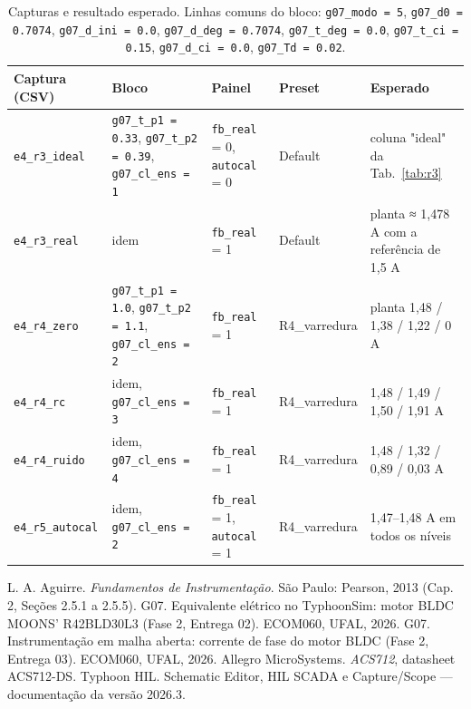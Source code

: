 \documentclass[10pt,a4paper]{article}
\begin{document}
\begin{table}[!htbp]\centering\footnotesize
\caption{Capturas e resultado esperado. Linhas comuns do bloco: \texttt{g07\_modo = 5}, \texttt{g07\_d0 = 0.7074}, \texttt{g07\_d\_ini = 0.0}, \texttt{g07\_d\_deg = 0.7074}, \texttt{g07\_t\_deg = 0.0}, \texttt{g07\_t\_ci = 0.15}, \texttt{g07\_d\_ci = 0.0}, \texttt{g07\_Td = 0.02}.}\label{tab:rot}
\begin{tabularx}{\textwidth}{p{2.6cm}p{3.6cm}p{2.3cm}p{2.0cm}Y}\toprule
Captura (CSV) & Bloco & Painel & Preset & Esperado\\\midrule
\texttt{e4\_r3\_ideal} & \texttt{g07\_t\_p1 = 0.33}, \texttt{g07\_t\_p2 = 0.39}, \texttt{g07\_cl\_ens = 1} & \texttt{fb\_real} = 0, \texttt{autocal} = 0 & Default & coluna "ideal" da Tab.~\ref{tab:r3}\\
\texttt{e4\_r3\_real} & idem & \texttt{fb\_real} = 1 & Default & planta ≈ 1,478 A com a referência de 1,5 A\\
\texttt{e4\_r4\_zero} & \texttt{g07\_t\_p1 = 1.0}, \texttt{g07\_t\_p2 = 1.1}, \texttt{g07\_cl\_ens = 2} & \texttt{fb\_real} = 1 & R4\_varredura & planta 1,48 / 1,38 / 1,22 / 0 A\\
\texttt{e4\_r4\_rc} & idem, \texttt{g07\_cl\_ens = 3} & \texttt{fb\_real} = 1 & R4\_varredura & 1,48 / 1,49 / 1,50 / 1,91 A\\
\texttt{e4\_r4\_ruido} & idem, \texttt{g07\_cl\_ens = 4} & \texttt{fb\_real} = 1 & R4\_varredura & 1,48 / 1,32 / 0,89 / 0,03 A\\
\texttt{e4\_r5\_autocal} & idem, \texttt{g07\_cl\_ens = 2} & \texttt{fb\_real} = 1, \texttt{autocal} = 1 & R4\_varredura & 1,47–1,48 A em todos os níveis\\\bottomrule
\end{tabularx}
\end{table}

\begin{thebibliography}{9}\small
{} L. A. Aguirre. \emph{Fundamentos de Instrumentação}. São Paulo: Pearson, 2013 (Cap. 2, Seções 2.5.1 a 2.5.5).
 G07. Equivalente elétrico no TyphoonSim: motor BLDC MOONS' R42BLD30L3 (Fase 2, Entrega 02). ECOM060, UFAL, 2026.
 G07. Instrumentação em malha aberta: corrente de fase do motor BLDC (Fase 2, Entrega 03). ECOM060, UFAL, 2026.
 Allegro MicroSystems. \emph{ACS712}, datasheet ACS712-DS.
 Typhoon HIL. Schematic Editor, HIL SCADA e Capture/Scope — documentação da versão 2026.3.
\end{thebibliography}
\end{document}

